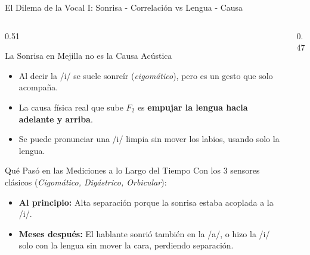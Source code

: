 \begin{frame}{El Dilema de la Vocal I: Sonrisa - Correlación vs Lengua - Causa}
    \begin{columns}[c]
        \begin{column}{0.51\textwidth}
            \scriptsize
            \begin{alertblock}{La Sonrisa en Mejilla no es la Causa Acústica}
                \begin{itemize}\setlength{\itemsep}{1pt}\setlength{\parskip}{0pt}
                    \item Al decir la /i/ se suele sonreír (\textit{cigomático}), pero es un gesto que solo acompaña.
                    \item La causa física real que sube $F_2$ es \textbf{empujar la lengua hacia adelante y arriba}.
                    \item Se puede pronunciar una /i/ limpia sin mover los labios, usando solo la lengua.
                \end{itemize}
            \end{alertblock}
            \vspace{0.1cm}
            \begin{exampleblock}{Qué Pasó en las Mediciones a lo Largo del Tiempo}
                Con los 3 sensores clásicos (\textit{Cigomático, Digástrico, Orbicular}):
                \begin{itemize}\setlength{\itemsep}{1pt}\setlength{\parskip}{0pt}
                    \item \textbf{Al principio:} Alta separación porque la sonrisa estaba acoplada a la /i/.
                    \item \textbf{Meses después:} El hablante sonrió también en la /a/, o hizo la /i/ solo con la lengua sin mover la cara, perdiendo separación.
                \end{itemize}
            \end{exampleblock}
        \end{column}
        \begin{column}{0.47\textwidth}
            \centering
        \end{column}
    \end{columns}
\end{frame}

